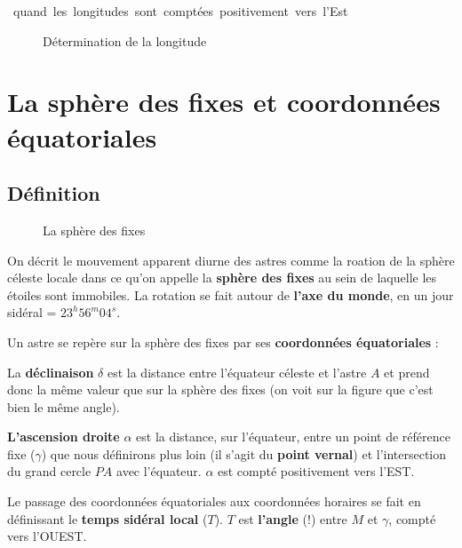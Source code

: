 \documentclass[12pt]{report}
\begin{document}
\begin{center}
 \ \mbox{quand les longitudes sont comptées positivement vers l'Est}
\end{center}
\bigskip


\begin{figure}[ht]
\begin{center}
\end{center}
\caption{Détermination de la longitude}
\label{fig:17}
\end{figure}


\chapter{La sphère des fixes et coordonnées équatoriales}

\section{Définition}

\begin{figure}[ht]
\begin{center}
\end{center}
\caption{La sphère des fixes}
\label{fig:18}
\end{figure}

On décrit le mouvement apparent diurne des astres comme la roation de la sphère céleste locale dans ce qu'on appelle la \textbf{sphère des fixes} au sein de laquelle les étoiles sont immobiles. La rotation se fait autour de \textbf{l'axe du monde}, en un jour sidéral = $23^h56^m04^s$.

Un astre se repère sur la sphère des fixes par ses \textbf{coordonnées équatoriales} :

La \textbf{déclinaison} $\delta$ est la distance entre l'équateur céleste et l'astre $A$ et prend donc la même valeur que sur la sphère des fixes (on voit sur la figure que c'est bien le même angle).

\textbf{L'ascension droite} $\alpha$  est la distance, sur l'équateur, entre un point de référence fixe ($\gamma$) que nous définirons plus loin (il s'agit du \textbf{point vernal}) et l'intersection du grand cercle $PA$ avec l'équateur. $\alpha$ est compté positivement vers l'EST. 

Le passage des coordonnées équatoriales aux coordonnées horaires se fait en définissant le \textbf{temps sidéral local} ($T$). $T$ est \textbf{l'angle} (!) entre $M$ et $\gamma$, compté vers l'OUEST. 
\end{document}

